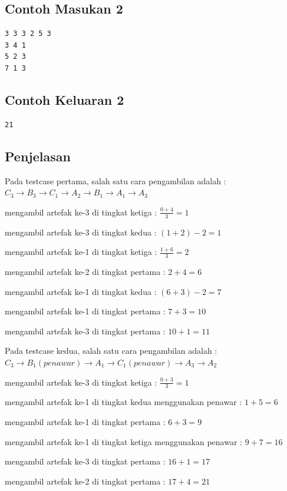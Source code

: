 \documentclass{article}
\begin{document}
\begin{multicols}{2}
\subsection*{Contoh Masukan 2}
\begin{lstlisting}
3 3 3 2 5 3
3 4 1
5 2 3
7 1 3
\end{lstlisting}
\columnbreak

\subsection*{Contoh Keluaran 2}
\begin{lstlisting}
21
\end{lstlisting}
\vfill
\null
\end{multicols}

\subsection*{Penjelasan}
Pada testcase pertama, salah satu cara pengambilan adalah  : {$C_3 \rightarrow B_3 \rightarrow C_1 \rightarrow A_2 \rightarrow B_1 \rightarrow A_1 \rightarrow A_3$}

mengambil artefak ke-3 di tingkat ketiga : $\frac{0+4}{3} = 1$

mengambil artefak ke-3 di tingkat kedua : $(1+2) - 2 = 1$

mengambil artefak ke-1 di tingkat ketiga : $\frac{1+6}{3} = 2$

mengambil artefak ke-2 di tingkat pertama : $2 + 4 = 6$

mengambil artefak ke-1 di tingkat kedua : $(6+3) - 2 = 7$

mengambil artefak ke-1 di tingkat pertama : $7 + 3 = 10$

mengambil artefak ke-3 di tingkat pertama : $10 + 1 = 11$\newline

Pada testcase kedua, salah satu cara pengambilan adalah : $C_3 \rightarrow B_1 (penawar) \rightarrow A_1 \rightarrow C_1 (penawar) \rightarrow A_3 \rightarrow A_2$

mengambil artefak ke-3 di tingkat ketiga : $\frac{0+3}{3} = 1$

mengambil artefak ke-1 di tingkat kedua menggunakan penawar : $1 + 5 = 6$

mengambil artefak ke-1 di tingkat pertama : $6 + 3 = 9$

mengambil artefak ke-1 di tingkat ketiga menggunakan penawar : $9 + 7 = 16$

mengambil artefak ke-3 di tingkat pertama : $16 + 1 = 17$

mengambil artefak ke-2 di tingkat pertama : $17 + 4 = 21$
\end{document}
